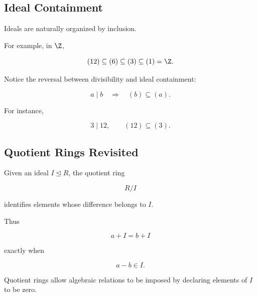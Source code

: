\subsection{Ideal Containment}
\label{subsec:ideal-containment}

Ideals are naturally organized by inclusion.

For example, in \(\Z\),

\[ (12)\subseteq(6)\subseteq(3)\subseteq(1)=\Z. \]

Notice the reversal between divisibility and ideal containment:

\[ a\mid b\quad\Longrightarrow\quad(b)\subseteq(a). \]

For instance,

\[ 3\mid12,\qquad(12)\subseteq(3). \]

\begin{center}
\end{center}

\subsection{Quotient Rings Revisited}
\label{subsec:commutative-quotient-rings}

Given an ideal \(I\trianglelefteq R\), the quotient ring

\[ R/I \]

identifies elements whose difference belongs to \(I\).

Thus

\[ a+I=b+I \]

exactly when

\[ a-b\in I. \]

Quotient rings allow algebraic relations to be imposed by declaring elements
of \(I\) to be zero.


